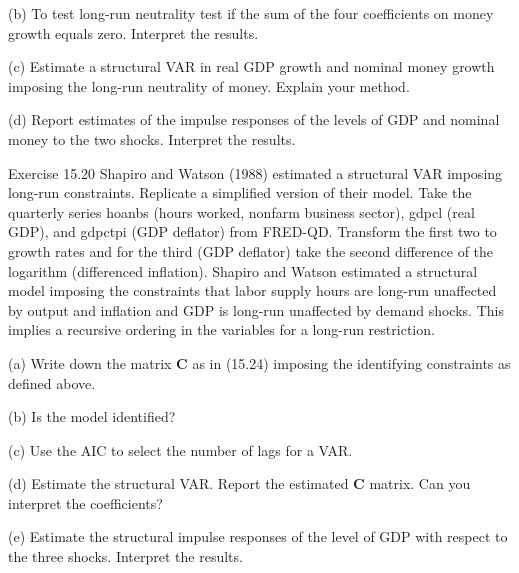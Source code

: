 \documentclass[10pt]{article}
\begin{document}
(b) To test long-run neutrality test if the sum of the four coefficients on money growth equals zero. Interpret the results.

(c) Estimate a structural VAR in real GDP growth and nominal money growth imposing the long-run neutrality of money. Explain your method.

(d) Report estimates of the impulse responses of the levels of GDP and nominal money to the two shocks. Interpret the results.

Exercise 15.20 Shapiro and Watson (1988) estimated a structural VAR imposing long-run constraints. Replicate a simplified version of their model. Take the quarterly series hoanbs (hours worked, nonfarm business sector), gdpcl (real GDP), and gdpctpi (GDP deflator) from FRED-QD. Transform the first two to growth rates and for the third (GDP deflator) take the second difference of the logarithm (differenced inflation). Shapiro and Watson estimated a structural model imposing the constraints that labor supply hours are long-run unaffected by output and inflation and GDP is long-run unaffected by demand shocks. This implies a recursive ordering in the variables for a long-run restriction.

(a) Write down the matrix $\boldsymbol{C}$ as in (15.24) imposing the identifying constraints as defined above.

(b) Is the model identified?

(c) Use the AIC to select the number of lags for a VAR.

(d) Estimate the structural VAR. Report the estimated $\boldsymbol{C}$ matrix. Can you interpret the coefficients?

(e) Estimate the structural impulse responses of the level of GDP with respect to the three shocks. Interpret the results.
\end{document}
